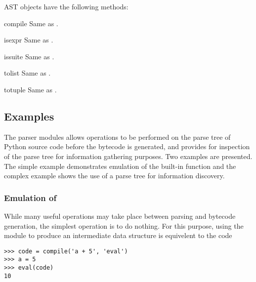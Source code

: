 AST objects have the following methods:


\begin{methoddesc}[AST]{compile}{}
Same as .
\end{methoddesc}

\begin{methoddesc}[AST]{isexpr}{}
Same as .
\end{methoddesc}

\begin{methoddesc}[AST]{issuite}{}
Same as .
\end{methoddesc}

\begin{methoddesc}[AST]{tolist}{}
Same as .
\end{methoddesc}

\begin{methoddesc}[AST]{totuple}{}
Same as .
\end{methoddesc}


\subsection{Examples}

The parser modules allows operations to be performed on the parse tree
of Python source code before the bytecode is generated, and provides
for inspection of the parse tree for information gathering purposes.
Two examples are presented.  The simple example demonstrates emulation
of the  built-in function and
the complex example shows the use of a parse tree for information
discovery.

\subsubsection{Emulation of }

While many useful operations may take place between parsing and
bytecode generation, the simplest operation is to do nothing.  For
this purpose, using the  module to produce an
intermediate data structure is equivelent to the code

\begin{verbatim}
>>> code = compile('a + 5', 'eval')
>>> a = 5
>>> eval(code)
10
\end{verbatim}

